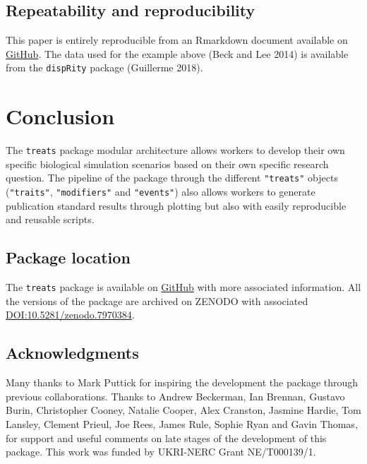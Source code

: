 \documentclass[
]{article}
\begin{document}
\hypertarget{repeatability-and-reproducibility}{%
\subsection{Repeatability and
reproducibility}\label{repeatability-and-reproducibility}}

This paper is entirely reproducible from an Rmarkdown document available
on \href{https://github.com/TGuillerme/treats/paper/}{GitHub}. The data
used for the example above (Beck and Lee 2014) is available from the
\texttt{dispRity} package (Guillerme 2018).

\hypertarget{conclusion}{%
\section{Conclusion}\label{conclusion}}

The \texttt{treats} package modular architecture allows workers to
develop their own specific biological simulation scenarios based on
their own specific research question. The pipeline of the package
through the different \texttt{"treats"} objects (\texttt{"traits"},
\texttt{"modifiers"} and \texttt{"events"}) also allows workers to
generate publication standard results through plotting but also with
easily reproducible and reusable scripts.

\hypertarget{package-location}{%
\subsection{Package location}\label{package-location}}

The \texttt{treats} package is available on
\href{https://github.com/TGuillerme/treats}{GitHub} with more associated
information. All the versions of the package are archived on ZENODO with
associated
\href{https://doi.org/10.5281/zenodo.7970384}{DOI:10.5281/zenodo.7970384}.

\hypertarget{acknowledgments}{%
\subsection{Acknowledgments}\label{acknowledgments}}

Many thanks to Mark Puttick for inspiring the development the package
through previous collaborations. Thanks to Andrew Beckerman, Ian
Brennan, Gustavo Burin, Christopher Cooney, Natalie Cooper, Alex
Cranston, Jasmine Hardie, Tom Lansley, Clement Prieul, Joe Rees, James
Rule, Sophie Ryan and Gavin Thomas, for support and useful comments on
late stages of the development of this package. This work was funded by
UKRI-NERC Grant NE/T000139/1.
\end{document}
